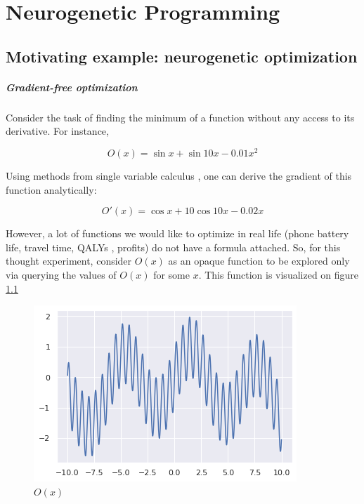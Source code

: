 \chapter{Neurogenetic Programming}\label{ch:neurogen}

\section{Motivating example: neurogenetic optimization}

\paragraph{Gradient-free optimization}

Consider the task of finding the minimum of a function without any access to its derivative. For instance,

\begin{equation}
O(x) = \sin x + \sin 10x - 0.01x^2
\end{equation}

Using methods from single variable calculus \cite{antonCalculusSingleVariable2021}, one can derive the gradient of this function analytically:

\begin{equation}
O'(x) = \cos x + 10 \cos 10x - 0.02x
\end{equation}

However, a lot of functions we would like to optimize in real life (phone battery life, travel time, QALYs \cite{ryenWillingnessPayQuality2015, torranceUtilitiesQualityadjustedLife1989}, profits) do not have a formula attached. 
So, for this thought experiment, consider $ O(x) $ as an opaque function to be explored only via querying the values of $ O(x) $ for some $x$.
This function is visualized on figure \ref{fig:neuropt-f}
    
\begin{figure}
    \centering
    \includegraphics[width=0.8\linewidth]{images/neuropt1.png}
    \caption{$O(x)$}
    \label{fig:neuropt-f}
\end{figure}

